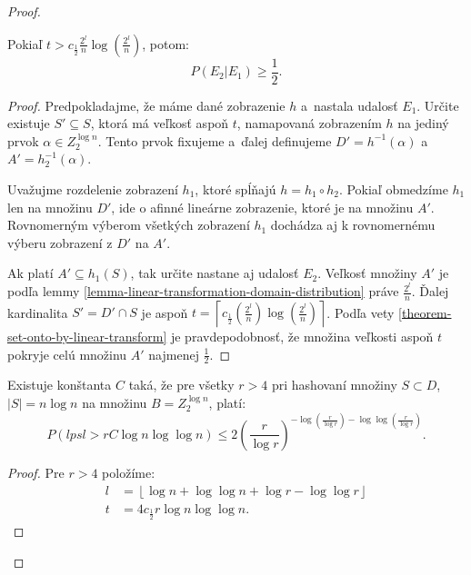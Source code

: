 \begin{proof}
\begin{remark}
\label{remark-prob-t-length-chain}
Pokiaľ $t > c_{\frac{1}{2}}{\frac{2^l}{n}}\log\left(\frac{2^l}{n}\right)$, potom:
\begin{displaymath}
P(E_2 | E_1) \geq \frac{1}{2} \textit{.}
\end{displaymath}
\end{remark}
\begin{proof}
Predpokladajme, že máme dané zobrazenie $h$ a~nastala udalosť $E_1$. Určite existuje $S' \subseteq S$, ktorá má veľkosť aspoň $t$, namapovaná zobrazením $h$ na jediný prvok $\alpha \in Z_2^{\log n}$. Tento prvok fixujeme a~ďalej definujeme $D' = h^{-1}(\alpha)$ a~$A' = h_2^{-1}(\alpha)$. 

Uvažujme rozdelenie zobrazení $h_1$, ktoré spĺňajú $h = h_1 \circ h_2$. Pokiaľ obmedzíme $h_1$ len na množinu $D'$, ide o afinné lineárne zobrazenie, ktoré je na množinu $A'$. Rovnomerným výberom všetkých zobrazení $h_1$ dochádza aj k rovnomernému výberu zobrazení z $D'$ na $A'$.

Ak platí $A' \subseteq h_1(S)$, tak určite nastane aj udalosť $E_2$. Veľkosť množiny $A'$ je podľa lemmy \ref{lemma-linear-transformation-domain-distribution} práve $\frac{2^l}{n}$. Ďalej kardinalita $S' = D' \cap S$ je aspoň $t = \left\lceil c_{\frac{1}{2}}\left(\frac{2^l}{n}\right)\log\left(\frac{2^l}{n}\right)\right\rceil$. Podľa vety \ref{theorem-set-onto-by-linear-transform} je pravdepodobnosť, že množina veľkosti aspoň $t$ pokryje celú množinu $A'$ najmenej $\frac{1}{2}$.
\end{proof}

\begin{remark}
Existuje konštanta $C$ taká, že pre všetky $r > 4$ pri hashovaní množiny $S \subset D$, $|S| = n \log n$ na množinu $B = Z_2^{\log n}$, platí:
\begin{displaymath}
P(lpsl > rC \log n \log \log n) \leq 2 \left(\frac{r}{\log r}\right)^{-\log \left(\frac{r}{\log r}\right) - \log \log \left(\frac{r}{\log r}\right)}\textit{.}
\end{displaymath}
\end{remark}
\begin{proof}
Pre $r > 4$ položíme:
\begin{displaymath}
\begin{split}
l & = \left\lfloor \log n + \log \log n + \log r - \log \log r \right\rfloor \\
t & = 4c_{\frac{1}{2}}r\log n \log \log n \textit{.}
\end{split}
\end{displaymath}


\end{proof}
\end{proof}
